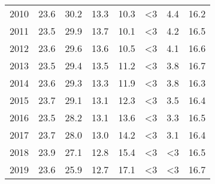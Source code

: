 \begin{tabular}{lrrrrrrr}
2010 &         23.6 &              30.2 &            13.3 &           10.3 &             <3 &                    4.4 &   16.2 \\
2011 &         23.5 &              29.9 &            13.7 &           10.1 &             <3 &                    4.2 &   16.5 \\
2012 &         23.6 &              29.6 &            13.6 &           10.5 &             <3 &                    4.1 &   16.6 \\
2013 &         23.5 &              29.4 &            13.5 &           11.2 &             <3 &                    3.8 &   16.7 \\
2014 &         23.6 &              29.3 &            13.3 &           11.9 &             <3 &                    3.8 &   16.3 \\
2015 &         23.7 &              29.1 &            13.1 &           12.3 &             <3 &                    3.5 &   16.4 \\
2016 &         23.5 &              28.2 &            13.1 &           13.6 &             <3 &                    3.3 &   16.5 \\
2017 &         23.7 &              28.0 &            13.0 &           14.2 &             <3 &                    3.1 &   16.4 \\
2018 &         23.9 &              27.1 &            12.8 &           15.4 &             <3 &                     <3 &   16.5 \\
2019 &         23.6 &              25.9 &            12.7 &           17.1 &             <3 &                     <3 &   16.7 \\
\bottomrule
\end{tabular}
